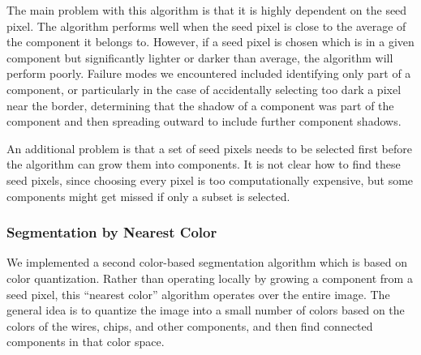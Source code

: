 \documentclass[10pt,twocolumn,letterpaper]{article}
\begin{document}
The main problem with this algorithm is that it is highly dependent on the seed
pixel. The algorithm performs well when the seed pixel is close to the
average of the component it belongs to. However, if a seed pixel is
chosen which is in a given component but significantly lighter or
darker than average, the algorithm will perform poorly. Failure modes
we encountered included identifying only part of a component, or
particularly in the case of accidentally selecting too dark a pixel
near the border, determining that the shadow of a component was part
of the component and then spreading outward to include further
component shadows. 

An additional problem is that a set of seed pixels needs to be
selected first before the algorithm can grow them into components. It
is not clear how to find these seed pixels, since choosing every pixel
is too computationally expensive, but some components might get missed if only a
subset is selected.

\subsubsection{Segmentation by Nearest Color}

We implemented a second color-based segmentation algorithm which is
based on color quantization. Rather than operating locally by growing
a component from a seed pixel, this ``nearest color'' algorithm
operates over the entire image. The general idea is to quantize the
image into a small number of colors based on the colors of the
wires, chips, and other components, and then find connected components
in that color space.
\end{document}
